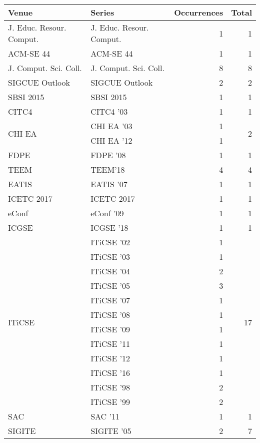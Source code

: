 \begin{table*}[t]
\begin{tabular}{llrr}
Venue & Series & Occurrences & Total\\\hline
\multirow{1}{*}{J. Educ. Resour. Comput.} & J. Educ. Resour. Comput. & 1 & \multirow{1}{*}{1}\\
\multirow{1}{*}{ACM-SE 44} & ACM-SE 44 & 1 & \multirow{1}{*}{1}\\
\multirow{1}{*}{J. Comput. Sci. Coll.} & J. Comput. Sci. Coll. & 8 & \multirow{1}{*}{8}\\
\multirow{1}{*}{SIGCUE Outlook} & SIGCUE Outlook & 2 & \multirow{1}{*}{2}\\
\multirow{1}{*}{SBSI 2015} & SBSI 2015 & 1 & \multirow{1}{*}{1}\\
\multirow{1}{*}{CITC4 } & CITC4 '03 & 1 & \multirow{1}{*}{1}\\
\multirow{2}{*}{CHI EA } & CHI EA '03 & 1 & \multirow{2}{*}{2}\\
& CHI EA '12 & 1 &\\
\multirow{1}{*}{FDPE } & FDPE '08 & 1 & \multirow{1}{*}{1}\\
\multirow{1}{*}{TEEM} & TEEM'18 & 4 & \multirow{1}{*}{4}\\
\multirow{1}{*}{EATIS } & EATIS '07 & 1 & \multirow{1}{*}{1}\\
\multirow{1}{*}{ICETC 2017} & ICETC 2017 & 1 & \multirow{1}{*}{1}\\
\multirow{1}{*}{eConf } & eConf '09 & 1 & \multirow{1}{*}{1}\\
\multirow{1}{*}{ICGSE } & ICGSE '18 & 1 & \multirow{1}{*}{1}\\
\multirow{12}{*}{ITiCSE } & ITiCSE '02 & 1 & \multirow{12}{*}{17}\\
& ITiCSE '03 & 1 &\\
& ITiCSE '04 & 2 &\\
& ITiCSE '05 & 3 &\\
& ITiCSE '07 & 1 &\\
& ITiCSE '08 & 1 &\\
& ITiCSE '09 & 1 &\\
& ITiCSE '11 & 1 &\\
& ITiCSE '12 & 1 &\\
& ITiCSE '16 & 1 &\\
& ITiCSE '98 & 2 &\\
& ITiCSE '99 & 2 &\\
\multirow{1}{*}{SAC } & SAC '11 & 1 & \multirow{1}{*}{1}\\
\multirow{5}{*}{SIGITE } & SIGITE '05 & 2 & \multirow{5}{*}{7}\\

\end{tabular}
\end{table*}
